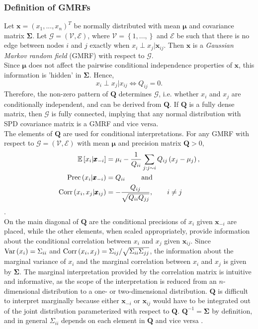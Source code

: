 \subsubsection{Definition of GMRFs}
Let $\pmb{x}=\left(x_1,...,x_n\right)^T$ be normally distributed with mean $\pmb{\mu}$ and covariance matrix $\pmb{\Sigma}$. Let $\mathcal{G}=\left(\mathcal{V}, \mathcal{E}\right)$, where $\mathcal{V}=\left\lbrace 1,...,\right\rbrace$ and $\mathcal{E}$ be such that there is no edge between nodes $i$ and $j$ exactly when $x_i\perp x_j|\pmb{x}_{ij}$. Then $\pmb{x}$ is a \textit{Gaussian Markov random field} (GMRF) with respect to $\mathcal{G}$. \\
Since $\pmb{\mu}$ does not affect the pairwise conditional independence properties of $\pmb{x}$, this information is 'hidden' in $\pmb{\Sigma}$. Hence,
\begin{equation*}
    x_i\perp x_j|x_{ij}\Longleftrightarrow Q_{ij}=0.
\end{equation*}
Therefore, the non-zero pattern of $\pmb{Q}$ determines $\mathcal{G}$, i.e. whether $x_i$ and $x_j$ are conditionally independent, and can be derived from $\pmb{Q}$. If $\pmb{Q}$ is a fully dense matrix, then $\mathcal{G}$ is fully connected, implying that any normal distribution with SPD covariance matrix is a GMRF and vice versa. \\
The elements of $\pmb{Q}$ are used for conditional interpretations. For any GMRF with respect to $\mathcal{G}=\left(\mathcal{V}, \mathcal{E}\right)$ with mean $\pmb{\mu}$ and precision matrix $\pmb{Q} > 0$,
\begin{align}
    \mathbb{E}\left[x_i|\pmb{x}_{-i}\right] &= \mu_i-\frac{1}{Q_{ii}}\sum_{j:j\sim i}Q_{ij}\left(x_j-\mu_j\right), \label{eq:mean_gmrf}\\
    \hbox{Prec}\left(x_i|\pmb{x}_{-i}\right) &= Q_{ii} \hspace{20pt}\hbox{ and }\label{eq:prec_gmrf}\\
    \hbox{Corr}\left(x_i,x_j|\pmb{x}_{ij}\right) &= -\frac{Q_{ij}}{\sqrt{Q_{ii}Q_{jj}}},\hspace{20pt} i\neq j
\end{align}
\autocite[][21]{rue2005gaussian}. \\
On the main diagonal of $\pmb{Q}$ are the conditional precisions of $x_i$ given $\pmb{x}_{-i}$ are placed, while the other elements, when scaled appropriately, provide information about the conditional correlation between $x_i$ and $x_j$ given $\pmb{x}_{ij}$. Since $\hbox{Var}\left(x_i\right)=\Sigma_{ii}$ and $\hbox{Corr}\left(x_i,x_j\right)=\Sigma_{ij}/\sqrt{\Sigma_{ii}\Sigma_{jj}}$, the information about the marginal variance of $x_i$ and the marginal correlation between $x_i$ and $x_j$ is given by $\pmb{\Sigma}$. The marginal interpretation provided by the correlation matrix is intuitive and informative, as the scope of the interpretation is reduced from an $n$-dimensional distribution to a one- or two-dimensional distribution. $\pmb{Q}$ is difficult to interpret marginally because either $\pmb{x}_{-i}$ or $\pmb{x}_{ij}$ would have to be integrated out of the joint distribution parameterized with respect to $\pmb{Q}$. $\pmb{Q}^{-1}=\pmb{\Sigma}$ by definition, and in general $\Sigma_{ii}$ depends on each element in $\pmb{Q}$ and vice versa \autocite[][20--23]{rue2005gaussian}.
